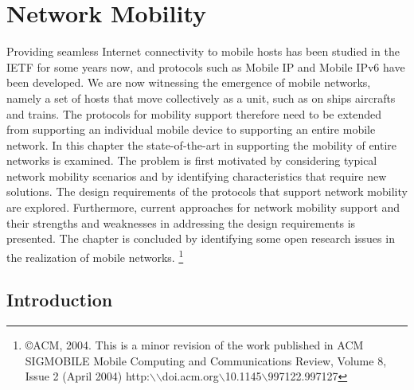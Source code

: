 \chapter{Network Mobility}
\author{E. Perera, A. Seneviratne and V. Sivaraman\\
The University of New South Wales}

Providing seamless Internet connectivity to mobile hosts has been studied in
the IETF for some years now, and protocols such as Mobile IP and Mobile IPv6
have been developed. We are now witnessing the emergence of mobile networks,
namely a set of hosts that move collectively as a unit, such as on ships
aircrafts and trains. The protocols for mobility support therefore need to be
extended from supporting an individual mobile device to supporting an entire
mobile network. In this chapter the state-of-the-art in supporting the
mobility of entire networks is examined. The problem is first motivated by
considering typical network mobility scenarios and by identifying
characteristics that require new solutions. The design requirements of the
protocols that support network mobility are explored. Furthermore, current
approaches for network mobility support and their strengths and weaknesses in
addressing the design requirements is presented. The chapter is concluded by
identifying some open research issues in the realization of mobile networks.
\footnote{\copyright ACM, 2004. This is a minor revision of the work published in ACM
SIGMOBILE Mobile Computing and Communications Review, Volume 8, Issue 2 (April 2004) http:$\backslash$$\backslash$doi.acm.org$\backslash$10.1145$\backslash$997122.997127}

\section{Introduction}

